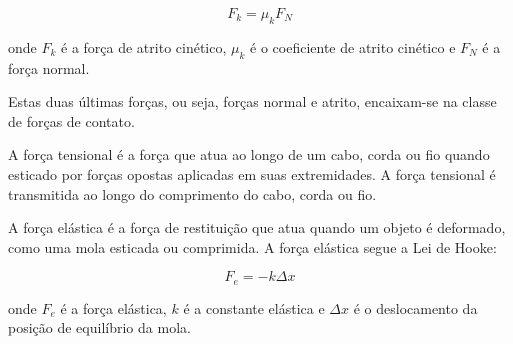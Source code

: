 \documentclass{article}
\begin{document}
\begin{equation}
F_k = \mu_k F_N
\end{equation}

onde $F_k$ é a força de atrito cinético, $\mu_k$ é o coeficiente de atrito cinético e $F_N$ é a força normal.
\begin{center}
\end{center}

  Estas duas \'ultimas for\c cas, ou seja, for\c cas normal e atrito, encaixam-se na classe de for\c cas de contato.

  A força tensional é a força que atua ao longo de um cabo, corda ou fio quando esticado por forças opostas aplicadas em suas extremidades. A força tensional é transmitida ao longo do comprimento do cabo, corda ou fio.
  \begin{center}
  \end{center}

A força elástica é a força de restitui\c c\~ao que atua quando um objeto é deformado, como uma mola esticada ou comprimida. A força elástica segue a Lei de Hooke:

\begin{equation}
F_e = -k \Delta x
\end{equation}

onde $F_e$ é a força elástica, $k$ é a constante elástica e $\Delta x$ é o deslocamento da posição de equilíbrio da mola.
\begin{center}
\end{center}
\end{document}
